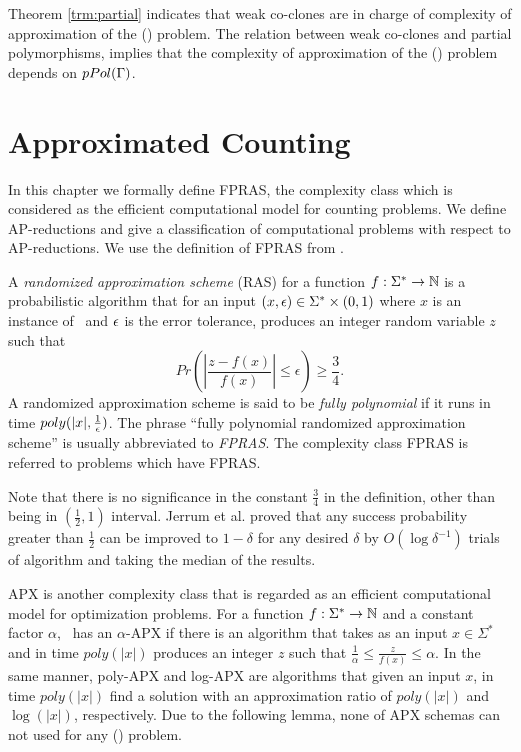Theorem \ref{trm:partial} indicates that weak co-clones are
in charge of complexity of approximation of the \ccsp(\mrelset) problem.
The relation between weak co-clones and partial polymorphisms,
implies that the complexity of approximation of the \ccsp(\mrelset) problem 
depends on \(pPol(\Gamma)\)\@.

\chapter{Approximated Counting}
In this chapter we formally define FPRAS, the complexity class which
is considered as the efficient computational model for counting problems.
We define AP-reductions and give a classification of computational problems 
with respect to AP-reductions. We use the definition of FPRAS from \cite{counting}\@. 

A \emph{randomized approximation scheme} (RAS) for a function \(f:\Sigma^*\to\mathbb{N}\)
is a probabilistic algorithm that for an input \((x,\epsilon)\in\Sigma^*\times(0,1)\) 
where \(x\) is an instance of \mf\ and \(\epsilon\) is the error tolerance, 
produces an integer random variable \(z\) such that 
\[Pr\left(\left|\frac{z-f(x)}{f(x)}\right|\le \epsilon\right) \ge \frac{3}{4}.\]
A randomized approximation scheme is said to be \emph{fully polynomial} if it runs in time \(poly(|x|,\frac{1}{\epsilon})\)\@. 
The phrase ``fully polynomial randomized approximation scheme'' is usually abbreviated to 
\emph{FPRAS}\@. The complexity class FPRAS is referred to problems which have FPRAS\@.

Note that there is no significance in the constant \(\frac{3}{4}\) in the definition,
other than being in \((\frac{1}{2},1)\) interval. 
Jerrum et al. \cite{JVV} proved that any success probability 
greater than \(\frac{1}{2}\) can be improved to \(1-\delta\) for any desired \(\delta\) by
\(O(\log \delta^{-1})\) trials of algorithm and taking the median of the results.

APX is another complexity class that is regarded as an efficient computational model for
optimization problems.
For a function \(f:\Sigma^*\to\mathbb{N}\) and a constant factor \(\alpha\),
\mf\ has an \(\alpha\)-APX if there is an algorithm that
takes as an input \(x\in\Sigma^*\) and in time \(poly(|x|)\) produces an integer \(z\)
such that \(\frac{1}{\alpha}\le\frac{z}{f(x)}\le \alpha\). In the same manner,
poly-APX and log-APX are algorithms that given an input
\(x\), in time \(poly(|x|)\) find a solution with an approximation ratio of \(poly(|x|)\)
and \(\log(|x|)\), respectively. Due to the following lemma, none of APX schemas can not
used for any \ccsp(\mrelset) problem.

